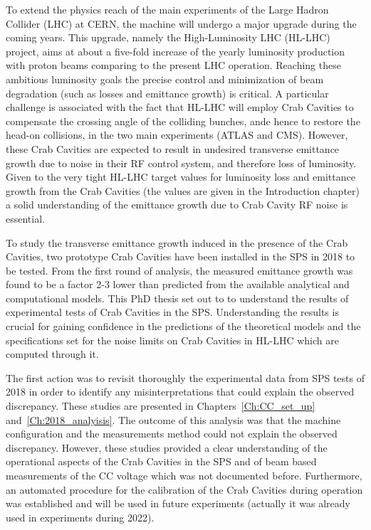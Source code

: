 
To extend the physics reach of the main experiments of the Large Hadron Collider (LHC) at CERN, the machine will undergo a major upgrade during the coming years. This upgrade, namely the High-Luminosity LHC (HL-LHC) project, aims at about a five-fold increase of the yearly luminosity production with proton beams comparing to the present LHC operation. Reaching these ambitious luminosity goals the precise control and minimization of beam degradation (such as losses and emittance growth) is critical. A particular challenge is associated with the fact that HL-LHC will employ Crab Cavities to compensate the crossing angle of the colliding bunches, ande hence to restore the head-on collisions, in the two main experiments (ATLAS and CMS). However, these Crab Cavities are expected to result in undesired transverse emittance growth due to noise in their RF control system, and therefore loss of luminosity. %
Given to the very tight HL-LHC target values for luminosity loss and emittance growth from the Crab Cavities (the values are given in the Introduction chapter)
a solid understanding of the emittance growth due to Crab Cavity RF noise is essential. 

To study the transverse emittance growth induced in the presence of the Crab Cavities, two prototype Crab Cavities have been installed in the SPS in 2018 to be tested. From the first round of analysis, the measured
emittance growth was found to be a factor 2-3 lower than predicted from the available analytical and computational models. This PhD thesis set out to to understand the results of experimental tests of Crab Cavities in the SPS. Understanding the results is crucial for gaining confidence in the predictions of the theoretical models and the specifications set for the noise limits on Crab Cavities in HL-LHC which are computed through it.


The first action was to revisit thoroughly the experimental data from SPS tests of 2018 in order to identify any misinterpretations that could explain the observed discrepancy. These studies are presented in Chapters~\ref{Ch:CC_set_up} and~\ref{Ch:2018_analyisis}. The outcome of this analysis was that the machine configuration and the measurements method could not explain the observed discrepancy. However, these studies provided a clear understanding of the operational aspects of the Crab Cavities in the SPS and of beam based measurements of the CC voltage which was not documented before. Furthermore, an automated procedure for the calibration of the Crab Cavities during operation was established and will be used in future experiments (actually it was already used in experiments during 2022).







